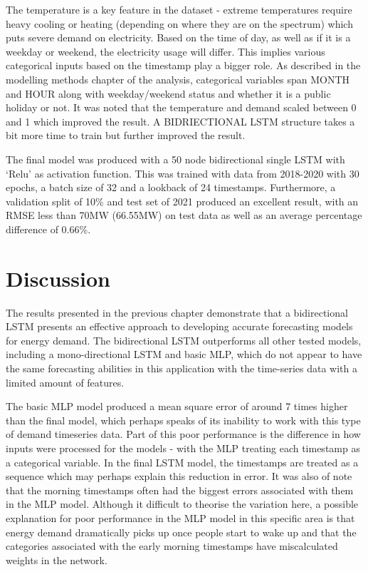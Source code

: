 \documentclass[mstat,12pt]{unswthesis}
\begin{document}
The temperature is a key feature in the dataset - extreme temperatures
require heavy cooling or heating (depending on where they are on the
spectrum) which puts severe demand on electricity. Based on the time of
day, as well as if it is a weekday or weekend, the electricity usage
will differ. This implies various categorical inputs based on the
timestamp play a bigger role. As described in the modelling methods
chapter of the analysis, categorical variables span MONTH and HOUR along
with weekday/weekend status and whether it is a public holiday or not.
It was noted that the temperature and demand scaled between 0 and 1
which improved the result. A BIDRIECTIONAL LSTM structure takes a bit
more time to train but further improved the result.

\bigskip

The final model was produced with a 50 node bidirectional single LSTM
with `Relu' as activation function. This was trained with data from
2018-2020 with 30 epochs, a batch size of 32 and a lookback of 24
timestamps. Furthermore, a validation split of 10\% and test set of 2021
produced an excellent result, with an RMSE less than 70MW (66.55MW) on
test data as well as an average percentage difference of 0.66\%.

\hypertarget{discussion}{%
\chapter{Discussion}\label{discussion}}

The results presented in the previous chapter demonstrate that a
bidirectional LSTM presents an effective approach to developing accurate
forecasting models for energy demand. The bidirectional LSTM outperforms
all other tested models, including a mono-directional LSTM and basic
MLP, which do not appear to have the same forecasting abilities in this
application with the time-series data with a limited amount of features.

\bigskip

The basic MLP model produced a mean square error of around 7 times
higher than the final model, which perhaps speaks of its inability to
work with this type of demand timeseries data. Part of this poor
performance is the difference in how inputs were processed for the
models - with the MLP treating each timestamp as a categorical variable.
In the final LSTM model, the timestamps are treated as a sequence which
may perhaps explain this reduction in error. It was also of note that
the morning timestamps often had the biggest errors associated with them
in the MLP model. Although it difficult to theorise the variation here,
a possible explanation for poor performance in the MLP model in this
specific area is that energy demand dramatically picks up once people
start to wake up and that the categories associated with the early
morning timestamps have miscalculated weights in the network.
\end{document}
